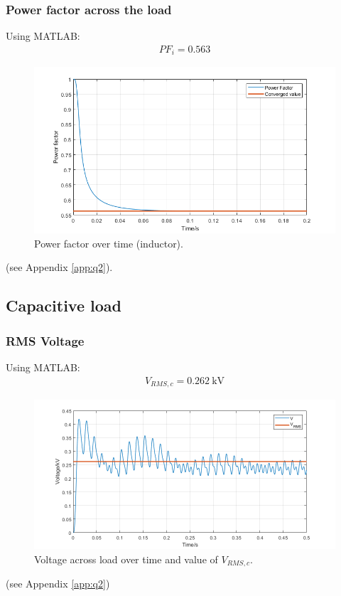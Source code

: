 \subsubsection{Power factor across the load}
Using MATLAB:
\begin{gather}
    PF_{i} = 0.563
\end{gather}
\begin{figure}[H]
    \centering
    \includegraphics[width = \textwidth]{img/figure10.png}
    \caption{Power factor over time (inductor).}
    \label{fig:PFInductor}
\end{figure}
(see Appendix \ref{app:q2}).
\subsection{Capacitive load}
\subsubsection{RMS Voltage}
Using MATLAB:
\begin{gather}
    V_{RMS,c} = \SI{0.262}{\kilo\volt}
\end{gather}
\begin{figure}[H]
    \centering
    \includegraphics[width = \textwidth]{img/figure9.png}
    \caption{Voltage across load over time and value of $V_{RMS,c}$.}
    \label{fig:VRMSCapacitor}
\end{figure}
(see Appendix \ref{app:q2})
